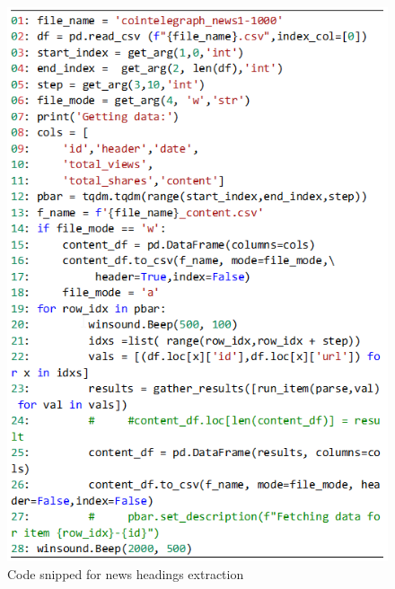 \begin{figure}[H]
   \centering
   \includegraphics[width=\linewidth]{fig/CodeSnippetNewsHeadingExtraction.png}
    \caption{Code snipped for news headings extraction}
    \label{fig:CodeSnippetNewsHeading}
\end{figure}

